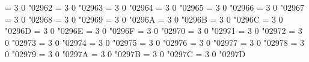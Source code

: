 \Umathchardef\leftharpoonsupdown = 3 0 "02962 %
\Umathchardef\upharpoonsleftright = 3 0 "02963 %
\Umathchardef\rightharpoonsupdown = 3 0 "02964 %
\Umathchardef\downharpoonsleftright = 3 0 "02965 %
\Umathchardef\leftrightharpoonsup = 3 0 "02966 %
\Umathchardef\leftrightharpoonsdown = 3 0 "02967 %
\Umathchardef\rightleftharpoonsup = 3 0 "02968 %
\Umathchardef\rightleftharpoonsdown = 3 0 "02969 %
\Umathchardef\leftharpoonupdash = 3 0 "0296A %
\Umathchardef\dashleftharpoondown = 3 0 "0296B %
\Umathchardef\rightharpoonupdash = 3 0 "0296C %
\Umathchardef\dashrightharpoondown = 3 0 "0296D %
\Umathchardef\updownharpoonsleftright = 3 0 "0296E %
\Umathchardef\downupharpoonsleftright = 3 0 "0296F %
\Umathchardef\rightimply = 3 0 "02970 %
\Umathchardef\equalrightarrow = 3 0 "02971 %
\Umathchardef\similarrightarrow = 3 0 "02972 %
\Umathchardef\leftarrowsimilar = 3 0 "02973 %
\Umathchardef\rightarrowsimilar = 3 0 "02974 %
\Umathchardef\rightarrowapprox = 3 0 "02975 %
\Umathchardef\ltlarr = 3 0 "02976 %
\Umathchardef\leftarrowless = 3 0 "02977 %
\Umathchardef\gtrarr = 3 0 "02978 %
\Umathchardef\subrarr = 3 0 "02979 %
\Umathchardef\leftarrowsubset = 3 0 "0297A %
\Umathchardef\suplarr = 3 0 "0297B %
\Umathchardef\leftfishtail = 3 0 "0297C %
\Umathchardef\rightfishtail = 3 0 "0297D %
